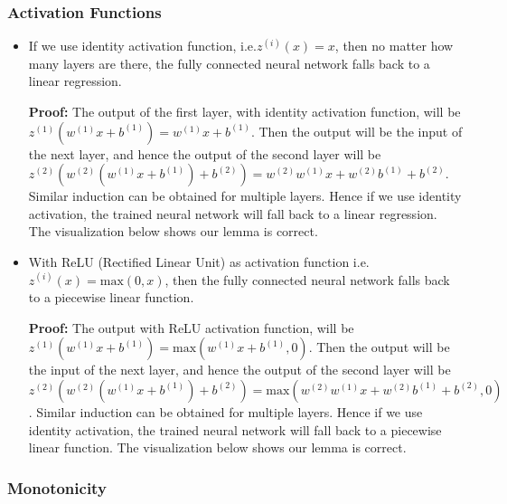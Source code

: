 \subsubsection{Activation Functions}

\begin{itemize}
\item
  If we use identity activation function, i.e.$z^{(i)}(x)=x$, then no
  matter how many layers are there, the fully connected neural network
  falls back to a linear regression.

  \textbf{Proof:} The output of the first layer, with identity
  activation function, will be
  \(z^{(1)}(w^{(1)}x+b^{(1)})=w^{(1)}x+b^{(1)}\). Then the output will
  be the input of the next layer, and hence the output of the second
  layer will be
  \(z^{(2)}(w^{(2)}(w^{(1)}x+b^{(1)})+b^{(2)})=w^{(2)}w^{(1)}x+w^{(2)}b^{(1)}+b^{(2)}\).
  Similar induction can be obtained for multiple layers. Hence if we use
  identity activation, the trained neural network will fall back to a
  linear regression. The visualization below shows our lemma is correct.
\item
  With ReLU (Rectified Linear Unit) as activation function
  i.e.~\(z^{(i)}(x)=\text{max}(0,x)\), then the fully connected neural
  network falls back to a piecewise linear function.

  \textbf{Proof:} The output with ReLU activation function, will be
  \(z^{(1)}(w^{(1)}x+b^{(1)})=\text{max}(w^{(1)}x+b^{(1)}, 0)\). Then
  the output will be the input of the next layer, and hence the output
  of the second layer will be
  \(z^{(2)}(w^{(2)}(w^{(1)}x+b^{(1)})+b^{(2)})=\text{max}(w^{(2)}w^{(1)}x+w^{(2)}b^{(1)}+b^{(2)},0)\).
  Similar induction can be obtained for multiple layers. Hence if we use
  identity activation, the trained neural network will fall back to a
  piecewise linear function. The visualization below shows our lemma is
  correct.
\end{itemize}

\subsubsection{Monotonicity}